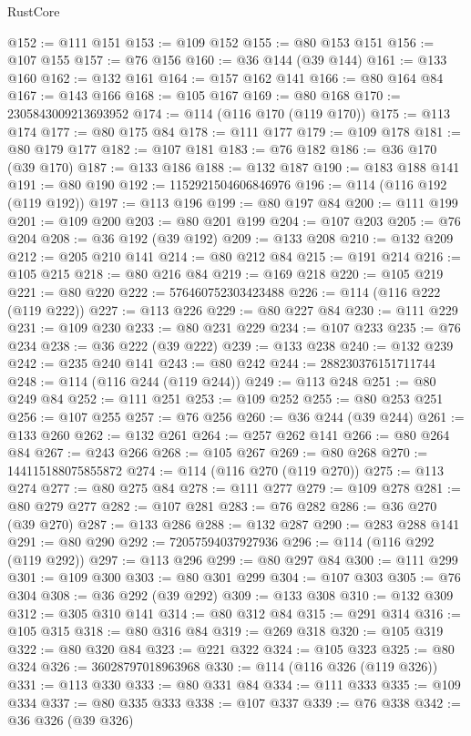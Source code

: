 \begin{lexlean}{RustCore}
\begin{coremodule}
@152 := @111 @151
@153 := @109 @152
@155 := @80 @153 @151
@156 := @107 @155
@157 := @76 @156
@160 := @36 @144 (@39 @144)
@161 := @133 @160
@162 := @132 @161
@164 := @157 @162 @141
@166 := @80 @164 @84
@167 := @143 @166
@168 := @105 @167
@169 := @80 @168
@170 := 2305843009213693952
@174 := @114 (@116 @170 (@119 @170))
@175 := @113 @174
@177 := @80 @175 @84
@178 := @111 @177
@179 := @109 @178
@181 := @80 @179 @177
@182 := @107 @181
@183 := @76 @182
@186 := @36 @170 (@39 @170)
@187 := @133 @186
@188 := @132 @187
@190 := @183 @188 @141
@191 := @80 @190
@192 := 1152921504606846976
@196 := @114 (@116 @192 (@119 @192))
@197 := @113 @196
@199 := @80 @197 @84
@200 := @111 @199
@201 := @109 @200
@203 := @80 @201 @199
@204 := @107 @203
@205 := @76 @204
@208 := @36 @192 (@39 @192)
@209 := @133 @208
@210 := @132 @209
@212 := @205 @210 @141
@214 := @80 @212 @84
@215 := @191 @214
@216 := @105 @215
@218 := @80 @216 @84
@219 := @169 @218
@220 := @105 @219
@221 := @80 @220
@222 := 576460752303423488
@226 := @114 (@116 @222 (@119 @222))
@227 := @113 @226
@229 := @80 @227 @84
@230 := @111 @229
@231 := @109 @230
@233 := @80 @231 @229
@234 := @107 @233
@235 := @76 @234
@238 := @36 @222 (@39 @222)
@239 := @133 @238
@240 := @132 @239
@242 := @235 @240 @141
@243 := @80 @242
@244 := 288230376151711744
@248 := @114 (@116 @244 (@119 @244))
@249 := @113 @248
@251 := @80 @249 @84
@252 := @111 @251
@253 := @109 @252
@255 := @80 @253 @251
@256 := @107 @255
@257 := @76 @256
@260 := @36 @244 (@39 @244)
@261 := @133 @260
@262 := @132 @261
@264 := @257 @262 @141
@266 := @80 @264 @84
@267 := @243 @266
@268 := @105 @267
@269 := @80 @268
@270 := 144115188075855872
@274 := @114 (@116 @270 (@119 @270))
@275 := @113 @274
@277 := @80 @275 @84
@278 := @111 @277
@279 := @109 @278
@281 := @80 @279 @277
@282 := @107 @281
@283 := @76 @282
@286 := @36 @270 (@39 @270)
@287 := @133 @286
@288 := @132 @287
@290 := @283 @288 @141
@291 := @80 @290
@292 := 72057594037927936
@296 := @114 (@116 @292 (@119 @292))
@297 := @113 @296
@299 := @80 @297 @84
@300 := @111 @299
@301 := @109 @300
@303 := @80 @301 @299
@304 := @107 @303
@305 := @76 @304
@308 := @36 @292 (@39 @292)
@309 := @133 @308
@310 := @132 @309
@312 := @305 @310 @141
@314 := @80 @312 @84
@315 := @291 @314
@316 := @105 @315
@318 := @80 @316 @84
@319 := @269 @318
@320 := @105 @319
@322 := @80 @320 @84
@323 := @221 @322
@324 := @105 @323
@325 := @80 @324
@326 := 36028797018963968
@330 := @114 (@116 @326 (@119 @326))
@331 := @113 @330
@333 := @80 @331 @84
@334 := @111 @333
@335 := @109 @334
@337 := @80 @335 @333
@338 := @107 @337
@339 := @76 @338
@342 := @36 @326 (@39 @326)

\end{coremodule}
\end{lexlean}
